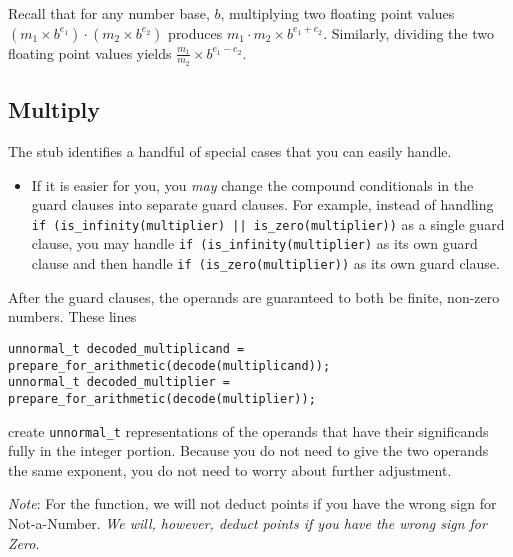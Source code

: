 Recall that for any number base, $b$, multiplying two floating point values $(m_1 \times b^{e_1}) \cdot (m_2 \times b^{e_2})$ produces $m_1 \cdot m_2 \times b^{e_1 + e_2}$.
Similarly, dividing the two floating point values yields $\frac{m_1}{m_2} \times b^{e_1 - e_2}$.

\subsection{Multiply}

The  stub identifies a handful of special cases that you can easily handle.
\begin{description}
    \begin{itemize}
        \item If it is easier for you, you \textit{may} change the compound conditionals in the guard clauses into separate guard clauses.
            For example, instead of handling \\ \lstinline{if (is_infinity(multiplier) || is_zero(multiplier))} as a single guard clause,
            you may handle \lstinline{if (is_infinity(multiplier)} as its own guard clause and then handle \lstinline{if (is_zero(multiplier))} as its own guard clause.
    \end{itemize}
\end{description}

After the guard clauses, the operands are guaranteed to both be finite, non-zero numbers.
These lines
\begin{lstlisting}
unnormal_t decoded_multiplicand = prepare_for_arithmetic(decode(multiplicand));
unnormal_t decoded_multiplier = prepare_for_arithmetic(decode(multiplier));
\end{lstlisting}
create \lstinline{unnormal_t} representations of the operands that have their significands fully in the integer portion.
Because you do not need to give the two operands the same exponent, you do not need to worry about further adjustment.

\begin{description}
\end{description}

\textit{Note}: For the  function, we will not deduct points if you have the wrong sign for Not-a-Number.
\textit{We will, however, deduct points if you have the wrong sign for Zero.}


